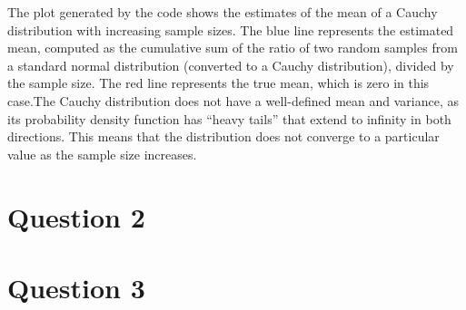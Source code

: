 \documentclass{article}
\begin{document}
The plot generated by the code shows the estimates of the mean of a
Cauchy distribution with increasing sample sizes. The blue line
represents the estimated mean, computed as the cumulative sum of the
ratio of two random samples from a standard normal distribution
(converted to a Cauchy distribution), divided by the sample size. The
red line represents the true mean, which is zero in this case.The Cauchy
distribution does not have a well-defined mean and variance, as its
probability density function has ``heavy tails'' that extend to infinity
in both directions. This means that the distribution does not converge
to a particular value as the sample size increases.

\section*{Question 2}

\newpage


\section*{Question 3}

\begin{Shaded}
\begin{Highlighting}[]
\SpecialCharTok{::}\SpecialCharTok{$}\NormalTok{(}\NormalTok{, }\NormalTok{, }\NormalTok{,}\NormalTok{, }\NormalTok{, }\NormalTok{)}


\OtherTok{\textless{}{-}} 
\OtherTok{\textless{}{-}} \NormalTok{(}\SpecialCharTok{*} \NormalTok{, } 
\OtherTok{\textless{}{-}}  \NormalTok{, }
\OtherTok{\textless{}{-}}\SpecialCharTok{+}\SpecialCharTok{\%*\%}\SpecialCharTok{+}
  \NormalTok{(}\NormalTok{(}
\NormalTok{\}}
\end{Highlighting}
\end{Shaded}
\end{document}
